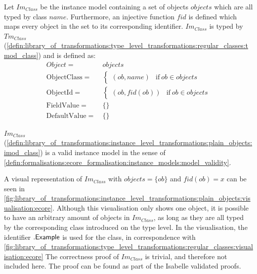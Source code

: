 \begin{defin}
\label{defin:library_of_transformations:instance_level_transformations:plain_objects:imod_class}
Let $Im_{Class}$ be the instance model containing a set of objects $objects$ which are all typed by class $name$. Furthermore, an injective function $fid$ is defined which maps every object in the set to its corresponding identifier. $Im_{Class}$ is typed by $Tm_{Class}$ (\cref{defin:library_of_transformations:type_level_transformations:regular_classes:tmod_class}) and is defined as:
\begin{align*}
Object =\ &objects \\
\mathrm{ObjectClass} =\ & \begin{cases}
    (ob, name) & \mathrm{if }\ ob \in objects
\end{cases}\\
\mathrm{ObjectId} =\ & \begin{cases}
    (ob, fid(ob)) & \mathrm{if }\ ob \in objects
\end{cases}\\
\mathrm{FieldValue} =\ & \{\} \\
\mathrm{DefaultValue} =\ & \{\}
\end{align*}
\end{defin}

\begin{thm}
\label{defin:library_of_transformations:instance_level_transformations:plain_objects:imod_class_correct}
$Im_{Class}$ (\cref{defin:library_of_transformations:instance_level_transformations:plain_objects:imod_class}) is a valid instance model in the sense of \cref{defin:formalisations:ecore_formalisation:instance_models:model_validity}.
\end{thm}

A visual representation of $Im_{Class}$ with $objects = \{ob\}$ and $fid(ob) = x$ can be seen in \cref{fig:library_of_transformations:instance_level_transformations:plain_objects:visualisation:ecore}. Although this visualisation only shows one object, it is possible to have an arbitrary amount of objects in $Im_{Class}$, as long as they are all typed by the corresponding class introduced on the type level. In the visualisation, the identifier $.\mathsf{Example}$ is used for the class, in correspondence with \cref{fig:library_of_transformations:type_level_transformations:regular_classes:visualisation:ecore} The correctness proof of $Im_{Class}$ is trivial, and therefore not included here. The proof can be found as part of the Isabelle validated proofs.

